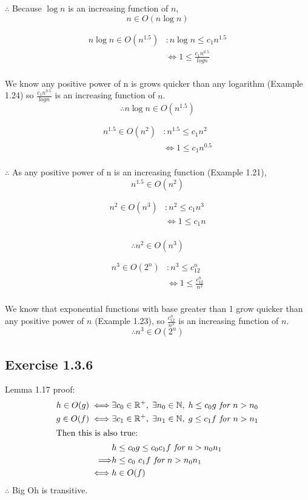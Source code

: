 \documentclass{article}
\newcommand\R{\mathbb{R}}
\begin{document}
\(\therefore\) Because \(\log{n}\) is an increasing function of \(n\), 
\[ n \in O(n\log{n})\]

 
 
\begin{align*}
n\log{n} \in O(n^{1.5})& : n\log{n} \leq c_1n^{1.5} \\
& \iff 1 \leq \frac{c_1n^{0.5}}{log{n}}\\
\end{align*}

We know any positive power of n is grows quicker than any logarithm (Example 1.24) so \(\frac{c_1n^{0.5}}{log{n}}\) is an increasing function of \(n\).
\[ \therefore n\log{n} \in O(n^{1.5})\]
 
 
 
\begin{align*}
n^{1.5} \in O(n^2)&: n^{1.5} \leq c_1n^2\\
& \iff 1 \leq c_1n^{0.5}\\
\end{align*}

\(\therefore\) As any positive power of n is an increasing function (Example 1.21), 
\[ n^{1.5} \in O(n^2)\]
 
 
 
\begin{align*}
n^2 \in O(n^3)&: n^2 \leq c_1n^3\\
& \iff 1 \leq c_1n\\
\end{align*}

\[\therefore n^2 \in O(n^3)\]



\begin{align*}
n^3 \in O(2^n)&:n^3 \leq c_12^n \\
& \iff 1 \leq \frac{c_12^n}{n^3}\\
\end{align*}


We know that exponential functions with base greater than 1 grow quicker than any positive power of \(n\) (Example 1.23),
so \(\frac{c_12^n}{n^3}\) is an increasing function of \(n\).
\[ \therefore n^3 \in O(2^n)\]



\subsection*{Exercise 1.3.6}

Lemma 1.17 proof:
\begin{align*}
h \in O(g)  \iff & \exists c_0 \in \R^+,\;\exists n_0 \in \mathbb{N},\;h \leq c_0g\textit{ for }  n > n_0 \\
g \in O(f)  \iff & \exists c_1 \in \R^+,\;\exists n_1 \in \mathbb{N},\;g \leq c_1f\textit{ for }  n > n_1 \\
\intertext{Then this is also true:}& h \leq c_0g \leq c_0 c_1 f \textit{ for }  n > n_0 n_1 \\
 \Longrightarrow & h \leq c_0 \ c_1 f \textit{ for }  n > n_0 n_1 \\
 \iff &h \in O(f)
\end{align*}
\(\therefore\) Big Oh is transitive.
\end{document}
